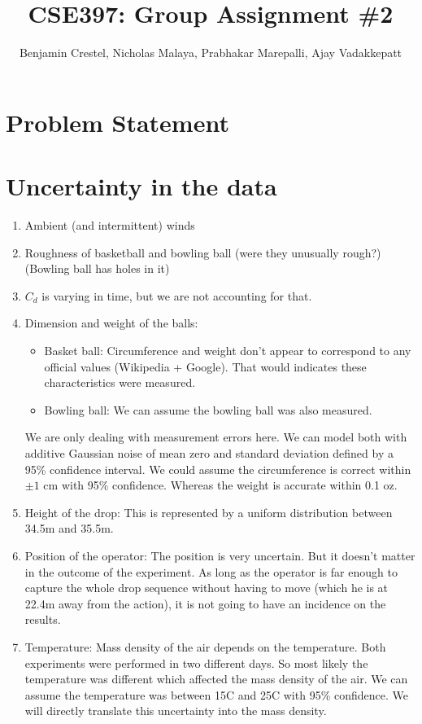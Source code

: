 \documentclass{article}
\title{\bf{CSE397: Group Assignment \#2}}
\author{Benjamin Crestel, Nicholas Malaya, Prabhakar Marepalli, Ajay Vadakkepatt}
\date{}
\begin{document}
\maketitle

\newpage
\section{Problem Statement}

\section{Uncertainty in the data}
\begin{enumerate}
 \item Ambient (and intermittent) winds
 \item Roughness of basketball and bowling ball (were they unusually
       rough?) (Bowling ball has holes in it)
 \item $C_d$ is varying in time, but we are not accounting for that.
 \item Dimension and weight of the balls:
\begin{itemize}
 \item Basket ball: Circumference and weight don't appear to correspond to any official values (Wikipedia + Google). That would indicates these characteristics were measured.
 \item Bowling ball: We can assume the bowling ball was also measured.
\end{itemize}
We are only dealing with measurement errors here. We can model both with additive Gaussian noise of mean zero and standard deviation defined by a 95\% confidence interval. We could assume the circumference is correct within $\pm 1$ cm with 95\% confidence. Whereas the weight is accurate within 0.1 oz.
 \item Height of the drop: This is represented by a uniform distribution between 34.5m and 35.5m.
 \item Position of the operator: The position is very uncertain. But it doesn't matter in the outcome of the experiment. As long as the operator is far enough to capture the whole drop sequence without having to move (which he is at 22.4m away from the action), it is not going to have an incidence on the results.
 \item Temperature: Mass density of the air depends on the temperature. Both experiments were performed in two different days. So most likely the temperature was different which affected the mass density of the air. We can assume the temperature was between 15C and 25C with 95\% confidence. We will directly translate this uncertainty into the mass density.

\end{enumerate}
\end{document}
